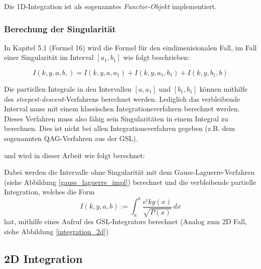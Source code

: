 Die 1D-Integration ist als sogenanntes \textit{Functor-Objekt} implementiert. 

\begin{center}
    
\end{center}

\subsubsection*{Berechung der Singularität}

In Kapitel 5.1 \cite[12]{gasperini:hal-03209144} (Formel 16) wird die Formel für den eindimenisionalen Fall, im Fall einer Singularität im Interval $[a_1, b_1]$ wie folgt beschrieben:

\begin{equation}
    I(k,y,a,b,) = I(k,y,a,a_1) + I(k,y,a_1, b_1) + I(k,y,b_1,b)
\end{equation}

Die partiellen Integrale in den Intervallen $[a,a_1]$ und  $[b_1,b_1]$ können mithilfe des \textit{steepest-descent}-Verfahrens berechnet werden.
Lediglich das verbleibende Interval muss mit einem klassischen Integrationsverfahren berechnet werden.
Dieses Verfahren muss also fähig sein Singularitäten in einem Integral zu berechnen. Dies ist nicht bei allen Integrationsverfahren gegeben (z.B. dem sogenannten QAG-Verfahren aus der GSL).

und wird in dieser Arbeit wie folgt berechnet:
\begin{center}
    
\end{center}

Dabei werden die Intervalle ohne Singularität mit dem Gauss-Laguerre-Verfahren (siehe Abbildung \ref{gauss_laguerre_impl}) berechnet und die verbleibende partielle Integration,
welches die Form
\begin{equation*}
    I(k,y,a,b) := \int_{a}^{b}  \frac{e^ikg(x)}{\sqrt{P(x)}} \,dx 
\end{equation*}
hat, mithilfe eines Aufruf des GSL-Integrators berechnet (Analog zum 2D Fall, siehe Abbildung \ref{integration_2d})



\subsection{2D Integration}\label{2dint}

